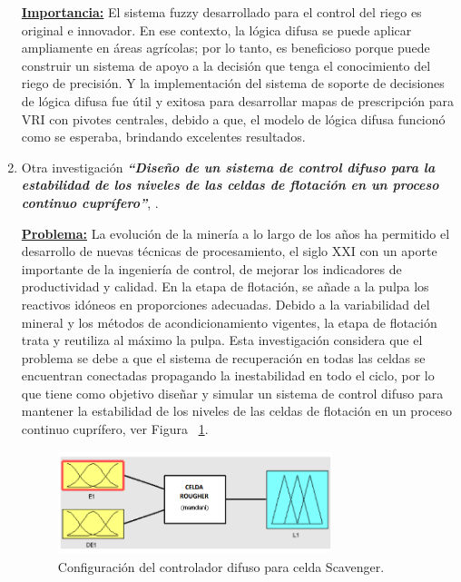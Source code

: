 \documentclass[10pt,conference]{IEEEtran}
\begin{document}
\begin{enumerate}
\textbf{\underline{Importancia:}} 
El sistema fuzzy desarrollado para el control del riego es original e innovador. En ese contexto, la lógica difusa se puede aplicar ampliamente en áreas agrícolas; por lo tanto, es beneficioso porque puede construir un sistema de apoyo a la decisión que tenga el conocimiento del riego de precisión. Y la implementación del sistema de soporte de decisiones de lógica difusa fue útil y exitosa para desarrollar mapas de prescripción para VRI con pivotes centrales, debido a que, el modelo de lógica difusa funcionó como se esperaba, brindando excelentes resultados.

\item Otra investigación \textit{\textbf{“Diseño de un sistema de control difuso para la estabilidad de los niveles de las celdas de flotación en un proceso continuo cuprífero”}}, \citep{haro2019diseno}.

\textbf{\underline{Problema:}} 
La evolución de la minería a lo largo de los años ha permitido el desarrollo de nuevas
técnicas de procesamiento, el siglo XXI con un aporte importante de la ingeniería de control, de mejorar los indicadores de productividad y calidad. En la etapa de flotación, se añade a la pulpa los reactivos idóneos en proporciones
adecuadas. Debido a la variabilidad del mineral y los métodos de acondicionamiento vigentes, la etapa de flotación trata y reutiliza al máximo la pulpa. Esta investigación considera que el problema se debe a que el sistema de recuperación en todas las celdas se encuentran conectadas propagando la
inestabilidad en todo el ciclo, por lo que tiene como objetivo diseñar y simular un sistema de control difuso para mantener la estabilidad de los niveles
de las celdas de flotación en un proceso continuo cuprífero, ver Figura ~\ref{AA1}.

    \begin{figure}[H]
    \begin{center}
    \includegraphics[width=8cm,height=3cm]{figuras/AA1.PNG}
    \caption{Configuración del controlador difuso para celda Scavenger.}
    \label{AA1} 
    \end{center}
    \end{figure}


\end{enumerate}
\end{document}
